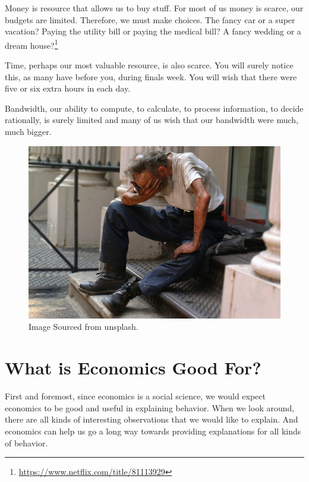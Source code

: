 \documentclass[
]{book}
\begin{document}
Money is resource that allows us to buy stuff. For most of us money is scarce, our budgets are limited. Therefore, we must make choices. The fancy car or a super vacation? Paying the utility bill or paying the medical bill? A fancy wedding or a dream house?\footnote{\url{https://www.netflix.com/title/81113929}}

Time, perhaps our most valuable resource, is also scarce. You will surely notice this, as many have before you, during finals week. You will wish that there were five or six extra hours in each day.

Bandwidth, our ability to compute, to calculate, to process information, to decide rationally, is surely limited and many of us wish that our bandwidth were much, much bigger.

\begin{figure}
\includegraphics[width=0.5\linewidth]{img/ch0/fig7} \caption{Image Sourced from unsplash.}\label{fig:fig007}
\end{figure}

\hypertarget{what-is-economics-good-for}{%
\section{What is Economics Good For?}\label{what-is-economics-good-for}}

First and foremost, since economics is a social science, we would expect economics to be good and useful in explaining behavior. When we look around, there are all kinds of interesting observations that we would like to explain. And economics can help us go a long way towards providing explanations for all kinds of behavior.
\end{document}
